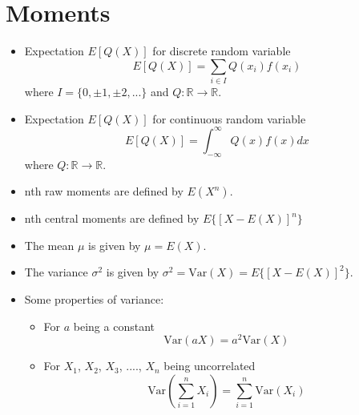 \documentclass[a4paper,12pt]{article}
\begin{document}
\section{Moments}
\begin{itemize}
\item Expectation $E[Q(X)]$ for discrete random variable
\begin{equation}
E[Q(X)] = \sum_{i \in I} Q(x_i) f(x_i)
\end{equation}
where $I = \{0, \pm 1, \pm 2, ...\}$ and $Q:\mathbb{R} \to \mathbb{R}$.

\item Expectation $E[Q(X)]$ for continuous random variable
\begin{equation}
E[Q(X)] = \int_{-\infty}^{\infty} Q(x) f(x) dx
\end{equation}
where $Q:\mathbb{R} \to \mathbb{R}$.

\item nth raw moments are defined by $E(X^n)$.

\item nth central moments are defined by $E\{[X-E(X)]^n\}$

\item The mean $\mu$ is given by $\mu = E(X)$.

\item The variance $\sigma^2$ is given by $\sigma^2 = \text{Var}(X) = E \{[ X - E(X)]^2 \}$.

\item Some properties of variance:
\begin{itemize}
\item For $a$ being a constant
\begin{equation}
\text{Var}(aX) = a^2 \text{Var}(X)
\end{equation} 
\item For $X_1$, $X_2$, $X_3$, ...., $X_n$ being uncorrelated
\begin{equation}
\text{Var} \left ( \sum_{i=1}^n X_i \right ) = \sum_{i=1}^n \text{Var}(X_i)
\end{equation}
\end{itemize}

\end{itemize}

\end{document}
